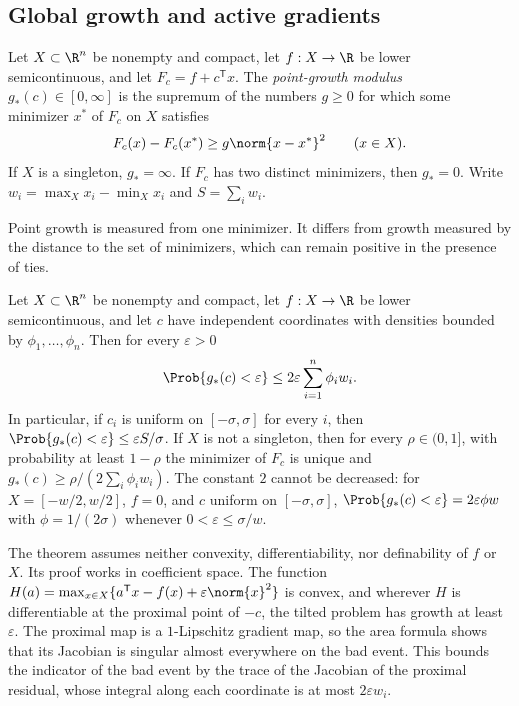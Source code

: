 \subsection{Global growth and active gradients}\label{sec:count:growth}

\begin{definition}\label{def:count:growth}
Let $X\subset\R^n$ be nonempty and compact, let $f:X\to\R$ be lower
semicontinuous, and let $F_c=f+c^{\mathsf T} x$. The \emph{point-growth modulus}
$g_*(c)\in[0,\infty]$ is the supremum of the numbers $g\ge0$ for which some
minimizer $x^*$ of $F_c$ on $X$ satisfies
\[
 F_c(x)-F_c(x^*)\ge g\norm{x-x^*}^2\qquad(x\in X).
\]
If $X$ is a singleton, $g_*=\infty$. If $F_c$ has two distinct minimizers,
then $g_*=0$. Write $w_i=\max_Xx_i-\min_Xx_i$ and $S=\sum_iw_i$.
\end{definition}

Point growth is measured from one minimizer. It differs from growth measured
by the distance to the set of minimizers, which can remain positive in the
presence of ties.

\begin{theorem}\label{thm:count:growth-tail}
Let $X\subset\R^n$ be nonempty and compact, let $f:X\to\R$ be lower
semicontinuous, and let $c$ have independent coordinates with densities
bounded by $\phi_1,\dots,\phi_n$. Then for every $\varepsilon>0$
\[
 \Prob\{g_*(c)<\varepsilon\}\le2\varepsilon\sum_{i=1}^n\phi_iw_i .
\]
In particular, if $c_i$ is uniform on $[-\sigma,\sigma]$ for every $i$, then
$\Prob\{g_*(c)<\varepsilon\}\le\varepsilon S/\sigma$. If $X$ is not a
singleton, then for every $\rho\in(0,1]$, with probability at least
$1-\rho$ the minimizer of $F_c$ is unique and
$g_*(c)\ge\rho/(2\sum_i\phi_iw_i)$. The constant $2$ cannot be decreased:
for $X=[-w/2,w/2]$, $f=0$, and $c$ uniform on $[-\sigma,\sigma]$,
$\Prob\{g_*(c)<\varepsilon\}=2\varepsilon\phi w$ with $\phi=1/(2\sigma)$
whenever $0<\varepsilon\le\sigma/w$.
\end{theorem}

The theorem assumes neither convexity, differentiability, nor definability of
$f$ or $X$. Its proof works in coefficient space. The function
$H(a)=\max_{x\in X}\{a^{\mathsf T} x-f(x)+\varepsilon\norm{x}^2\}$ is convex, and
wherever $H$ is differentiable at the proximal point of $-c$, the tilted
problem has growth at least $\varepsilon$. The proximal map is a
$1$-Lipschitz gradient map, so the area formula shows that its Jacobian is
singular almost everywhere on the bad event. This bounds the indicator of
the bad event by the trace of the Jacobian of the proximal residual, whose
integral along each coordinate is at most $2\varepsilon w_i$.

